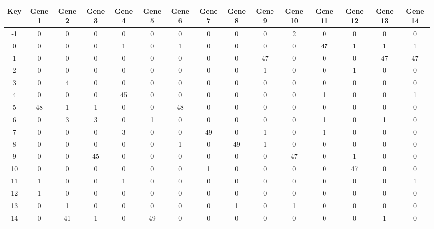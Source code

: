 \begin{tabular}{|c|c|c|c|c|c|c|c|c|c|c|c|c|c|c|}
\hline
Key & Gene 1 & Gene 2 & Gene 3 & Gene 4 & Gene 5 & Gene 6 & Gene 7 & Gene 8 & Gene 9 & Gene 10 & Gene 11 & Gene 12 & Gene 13 & Gene 14 \\
\hline
-1 & 0 & 0 & 0 & 0 & 0 & 0 & 0 & 0 & 0 & 2 & 0 & 0 & 0 & 0 \\
0 & 0 & 0 & 0 & 1 & 0 & 1 & 0 & 0 & 0 & 0 & 47 & 1 & 1 & 1 \\
1 & 0 & 0 & 0 & 0 & 0 & 0 & 0 & 0 & 47 & 0 & 0 & 0 & 47 & 47 \\
2 & 0 & 0 & 0 & 0 & 0 & 0 & 0 & 0 & 1 & 0 & 0 & 1 & 0 & 0 \\
3 & 0 & 4 & 0 & 0 & 0 & 0 & 0 & 0 & 0 & 0 & 0 & 0 & 0 & 0 \\
4 & 0 & 0 & 0 & 45 & 0 & 0 & 0 & 0 & 0 & 0 & 1 & 0 & 0 & 1 \\
5 & 48 & 1 & 1 & 0 & 0 & 48 & 0 & 0 & 0 & 0 & 0 & 0 & 0 & 0 \\
6 & 0 & 3 & 3 & 0 & 1 & 0 & 0 & 0 & 0 & 0 & 1 & 0 & 1 & 0 \\
7 & 0 & 0 & 0 & 3 & 0 & 0 & 49 & 0 & 1 & 0 & 1 & 0 & 0 & 0 \\
8 & 0 & 0 & 0 & 0 & 0 & 1 & 0 & 49 & 1 & 0 & 0 & 0 & 0 & 0 \\
9 & 0 & 0 & 45 & 0 & 0 & 0 & 0 & 0 & 0 & 47 & 0 & 1 & 0 & 0 \\
10 & 0 & 0 & 0 & 0 & 0 & 0 & 1 & 0 & 0 & 0 & 0 & 47 & 0 & 0 \\
11 & 1 & 0 & 0 & 1 & 0 & 0 & 0 & 0 & 0 & 0 & 0 & 0 & 0 & 1 \\
12 & 1 & 0 & 0 & 0 & 0 & 0 & 0 & 0 & 0 & 0 & 0 & 0 & 0 & 0 \\
13 & 0 & 1 & 0 & 0 & 0 & 0 & 0 & 1 & 0 & 1 & 0 & 0 & 0 & 0 \\
14 & 0 & 41 & 1 & 0 & 49 & 0 & 0 & 0 & 0 & 0 & 0 & 0 & 1 & 0 \\
\hline
\end{tabular}
